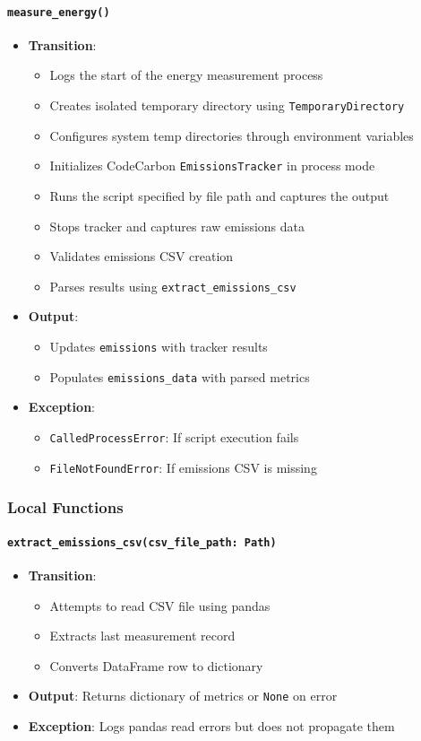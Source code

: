 \documentclass[12pt, titlepage]{article}
\begin{document}
\paragraph{\texttt{measure\_energy()}}
\begin{itemize}
\item \textbf{Transition}:
\begin{itemize}
\item Logs the start of the energy measurement process
\item Creates isolated temporary directory using \texttt{TemporaryDirectory}
\item Configures system temp directories through environment variables
\item Initializes CodeCarbon \texttt{EmissionsTracker} in process mode
\item Runs the script specified by file path and captures the output
\item Stops tracker and captures raw emissions data
\item Validates emissions CSV creation
\item Parses results using \texttt{extract\_emissions\_csv}
\end{itemize}
\item \textbf{Output}:
\begin{itemize}
\item Updates \texttt{emissions} with tracker results
\item Populates \texttt{emissions\_data} with parsed metrics
\end{itemize}
\item \textbf{Exception}:
\begin{itemize}
\item \texttt{CalledProcessError}: If script execution fails
\item \texttt{FileNotFoundError}: If emissions CSV is missing
\end{itemize}
\end{itemize}

\subsubsection{Local Functions}

\paragraph{\texttt{extract\_emissions\_csv(csv\_file\_path: Path)}}
\begin{itemize}
\item \textbf{Transition}:
\begin{itemize}
\item Attempts to read CSV file using pandas
\item Extracts last measurement record
\item Converts DataFrame row to dictionary
\end{itemize}
\item \textbf{Output}: Returns dictionary of metrics or \texttt{None} on error
\item \textbf{Exception}: Logs pandas read errors but does not propagate them
\end{itemize}
  
\end{document}
